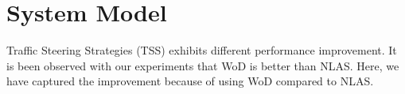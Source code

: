 \documentclass[conference]{IEEEtran}
\begin{document}
\section{System Model}
Traffic Steering Strategies (TSS) exhibits different performance improvement. It is been observed with our experiments that WoD is better than NLAS. Here, we have captured the improvement because of using WoD compared to NLAS.
\end{document}

